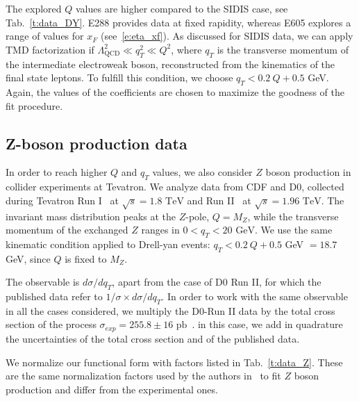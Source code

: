 \documentclass[aps,preprintnumbers,showpacs,nofootinbib,superscriptaddress,floatfix]{revtex4}
\begin{document}
The explored $Q$ values are higher compared to the SIDIS case, see Tab.~\ref{t:data_DY}. E288 provides data at fixed rapidity, whereas E605 explores a range of values for $x_F$ (see~\eqref{e:eta_xf}).  
As discussed for SIDIS data, we can apply TMD factorization if $\Lambda_{\text{QCD}}^2 \ll q_T^2 \ll Q^2$, where $q_T$ is the transverse momentum of the intermediate electroweak boson, reconstructed from the kinematics of the final state leptons. To fulfill this condition, we choose $q_T < 0.2\ Q + 0.5$ GeV. Again, the values of the coefficients are chosen to maximize the goodness of the fit procedure.

\subsection{Z-boson production data}
\label{ss:zboson}

In order to reach higher $Q$ and $q_T$ values, we also consider $Z$ boson production in collider experiments at Tevatron. 
We analyze data from CDF and D0, collected during Tevatron Run I~\cite{Affolder:1999jh,Abbott:1999wk} at $\sqrt{s}=1.8\text{ TeV}$ and Run II~\cite{Aaltonen:2012fi,Abazov:2007ac} at $\sqrt{s}=1.96\text{ TeV}$. 
The invariant mass distribution peaks at the $Z$-pole, $Q=M_Z$, while the transverse momentum of the exchanged $Z$ ranges in $0< q_T < 20 \text{ GeV}$.
We use the same kinematic condition applied to Drell-yan events:  $q_T < 0.2\ Q + 0.5$ GeV $ = 18.7$ GeV, since $Q$ is fixed to $M_Z$. 

The observable is $d\sigma /dq_T$,  apart from the case of D0 Run II, for which the published data refer to $1/\sigma \times d\sigma/dq_T$. In order to work with the same observable in all the cases considered, we multiply the D0-Run II data by the total cross section of the process $\sigma_{exp} = 255.8 \pm 16 \text{ pb}$~\cite{Abazov:2007ac}. in this case, we add in quadrature the uncertainties of the total cross section and of the published data. 

We normalize our functional form with factors listed in Tab.~\ref{t:data_Z}. These are the same normalization factors used by the authors in~\cite{DAlesio:2014mrz} to fit $Z$ boson production and differ from the experimental ones. 



\renewcommand{\tabcolsep}{0.4pc} %
\renewcommand{\arraystretch}{1.3} %
\end{document}
